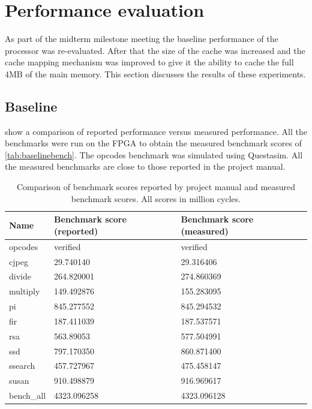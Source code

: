 \section{Performance evaluation}
\label{sec:performance}
As part of the midterm milestone meeting the baseline performance of the processor was re-evaluated. After that the size of the cache was increased and the cache mapping mechanism was improved to give it the ability to cache the full 4MB of the main memory. This section discusses the results of these experiments.

\subsection{Baseline}
 show a comparison of reported performance versus measured performance. All the benchmarks were run on the FPGA to obtain the measured benchmark scores of \cref{tab:baselinebench}. The opcodes benchmark was simulated using Questasim. All the measured benchmarks are close to those reported in the project manual.
\begin{table}[H]
\centering
\begin{tabular}{lll}
\hline
Name       & Benchmark score (reported) & Benchmark score (measured) \\ \hline
opcodes    & verified                   & verified                   \\
cjpeg      & 29.740140                  & 29.316406                            \\
divide     & 264.820001                 & 274.860369                            \\
multiply   & 149.492876                 &   155.283095                          \\
pi         & 845.277552                 &   845.294532                          \\
fir        & 187.411039                 &  187.537571                           \\
rsa        & 563.89053                  &   577.504991                          \\
ssd        & 797.170350                 &  860.871400                           \\
ssearch    & 457.727967                 &  475.458147                           \\
susan      & 910.498879                 &  916.969617                           \\
bench\_all & 4323.096258                &  4323.096128                          \\ \hline
\end{tabular}
\caption{Comparison of benchmark scores reported by project manual and measured benchmark scores. All scores in million cycles.}
\label{tab:largecachebench}
\end{table}
